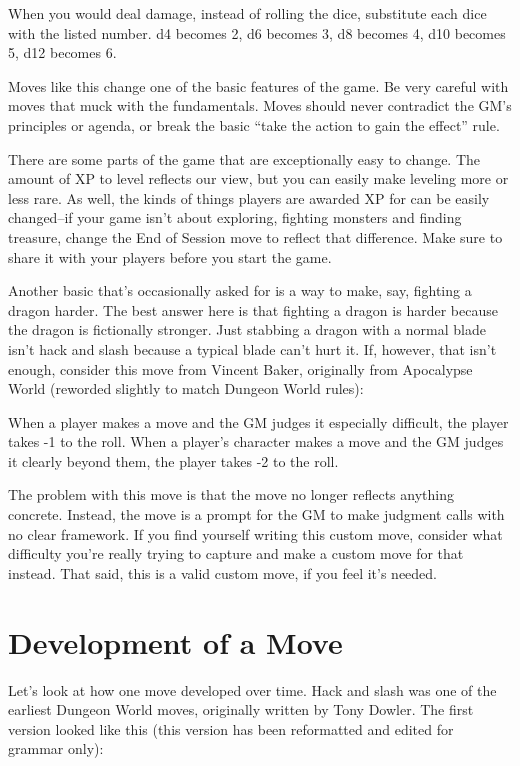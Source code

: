  When you would deal damage, instead of rolling the dice, substitute each dice with the listed number. d4 becomes 2, d6 becomes 3, d8 becomes 4, d10 becomes 5, d12 becomes 6.


 Moves like this change one of the basic features of the game. Be very careful with moves that muck with the fundamentals. Moves should never contradict the GM's principles or agenda, or break the basic ``take the action to gain the effect'' rule.


 There are some parts of the game that are exceptionally easy to change. The amount of XP to level reflects our view, but you can easily make leveling more or less rare. As well, the kinds of things players are awarded XP for can be easily changed--if your game isn't about exploring, fighting monsters and finding treasure, change the End of Session move to reflect that difference. Make sure to share it with your players before you start the game.


 Another basic that's occasionally asked for is a way to make, say, fighting a dragon harder. The best answer here is that fighting a dragon is harder because the dragon is fictionally stronger. Just stabbing a dragon with a normal blade isn't hack and slash because a typical blade can't hurt it. If, however, that isn't enough, consider this move from Vincent Baker, originally from Apocalypse World (reworded slightly to match Dungeon World rules):


 When a player makes a move and the GM judges it especially difficult, the player takes -1 to the roll. When a player's character makes a move and the GM judges it clearly beyond them, the player takes -2 to the roll.


 The problem with this move is that the move no longer reflects anything concrete. Instead, the move is a prompt for the GM to make judgment calls with no clear framework. If you find yourself writing this custom move, consider what difficulty you're really trying to capture and make a custom move for that instead. That said, this is a valid custom move, if you feel it's needed.
\section{Development of a Move}


 Let's look at how one move developed over time. Hack and slash was one of the earliest Dungeon World moves, originally written by Tony Dowler. The first version looked like this (this version has been reformatted and edited for grammar only):


